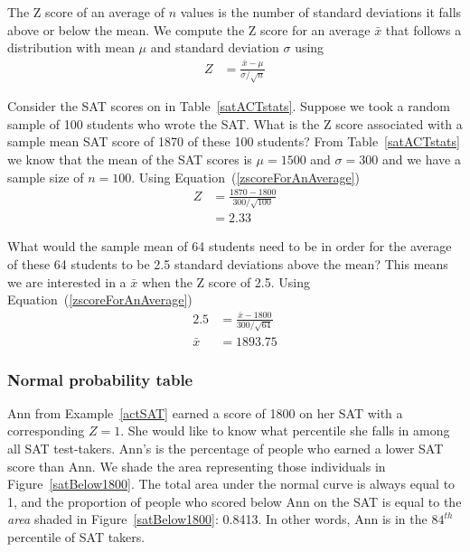 \begin{termBox}{
The Z score of an average of $n$ values is the number of standard deviations 
it falls above or below the mean. 
We compute the Z score for an average $\bar{x}$ that follows a distribution with mean $\mu$ and standard deviation $\sigma$ using
\begin{eqnarray*}
Z & = \displaystyle\frac{ \bar{x} - \mu}{ \sigma /\sqrt{n}}		\label{zscoreForAnAverage}
\end{eqnarray*}}
\end{termBox}









\begin{example}{Consider the SAT scores on in Table~\vref{satACTstats}.
Suppose we took a random sample of 100 students who wrote the SAT.
What is the Z score associated with a sample mean SAT score of 1870 of these 100 students?}
From Table~\ref{satACTstats} we know that the mean of the SAT scores is
$\mu = 1500$ and $\sigma = 300$ and we have a sample size of $n=100$.
Using Equation~(\ref{zscoreForAnAverage})
\begin{align*}
Z 	& = \frac{1870 - 1800}{300 / \sqrt{100}}\\
	& = 2.33
\end{align*}
\end{example}


\begin{example}{What would the sample mean of 64 students need to be in order 
for the average of these 64 students to be 2.5 standard deviations above the mean?}
This means we are interested in a $\bar{x}$ when the Z score of 2.5.
Using Equation~(\ref{zscoreForAnAverage})
\begin{align*}
2.5 		& = \frac{\bar{x} - 1800}{300 / \sqrt{64}}\\
\bar{x}	& = 1893.75
\end{align*}
\end{example}



\subsubsection{Normal probability table}

\begin{example}{Ann from Example~\ref{actSAT} earned a score of 1800 on her SAT with a corresponding $Z=1$. She would like to know what percentile she falls in among all SAT test-takers.}
Ann's  is the percentage of people who earned a lower SAT score than Ann. We shade the area representing those individuals in Figure~\ref{satBelow1800}. The total area under the normal curve is always equal to 1, and the proportion of people who scored below Ann on the SAT is equal to the \emph{area} shaded in Figure~\ref{satBelow1800}: 0.8413. In other words, Ann is in the $84^{th}$ percentile of SAT takers.
\end{example}

